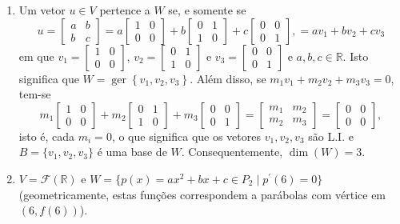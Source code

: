 \documentclass[12pt,a4paper]{article}
\newcommand*\ger[1]{\operatorname{ger}\left\{#1\right\}}
\newcommand*\R{\mathbb{R}}
\begin{document}
\begin{enumerate}
\begin{enumerate}
\item Um vetor $u \in V$ pertence a $W$ se, e somente se
\[
u
=
\begin{bmatrix}
a & b \\ b & c
\end{bmatrix}
=
a\begin{bmatrix}
1 & 0 \\ 0 & 0
\end{bmatrix}
+b\begin{bmatrix}
0 & 1 \\ 1 & 0
\end{bmatrix}
+c\begin{bmatrix}
0 & 0 \\ 0 & 1
\end{bmatrix},
= a v_1 + bv_2 + cv_3
\]
em que $v_1
=
\begin{bmatrix}
1 & 0 \\ 0 & 0
\end{bmatrix}$,
$v_2=
\begin{bmatrix}
0 & 1 \\ 1 & 0
\end{bmatrix}$
e
$v_3=
\begin{bmatrix}
0 & 0 \\ 0 & 1
\end{bmatrix}$ e $a,b,c \in \R$. Isto significa que $W = \ger{v_1,v_2,v_3}$. Além disso, se $m_1 v_1 + m_2 v_2 + m_3v_3 = 0$, tem-se
\[
m_1
\begin{bmatrix}
1 & 0 \\ 0 & 0
\end{bmatrix}
+m_2
\begin{bmatrix}
0 & 1 \\ 1 & 0
\end{bmatrix}
+m_3
\begin{bmatrix}
0 & 0 \\ 0 & 1
\end{bmatrix}
=
\begin{bmatrix}
m_1 & m_2 \\ m_2 & m_3
\end{bmatrix}
=\begin{bmatrix}
0 & 0 \\ 0 & 0
\end{bmatrix},
\]
isto é, cada $m_i = 0$, o que significa que os vetores $v_1, v_2, v_3$ são  L.I. e $B = \{v_1, v_2, v_3\}$ é uma base de $W$. Consequentemente, $\dim(W) = 3$.

\item $V = \mathcal{F}(\R)$ e $W = \{ p(x) = ax^2+bx+c \in P_2 \mid p^\prime(6) = 0 \}$ (geometricamente, estas funções correspondem a parábolas com vértice em $(6, f(6))$).


\end{enumerate}
\end{enumerate}
\end{document}
